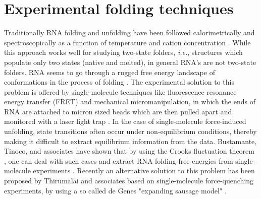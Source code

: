 \section{Experimental folding techniques}
Traditionally   RNA   folding  and   unfolding   have  been   followed
calorimetrically  and spectroscopically as  a function  of temperature
and cation concentration  \cite{bloomfield2000, boots2008}. While this
approach  works well  for studying  two-state  folders, \textit{i.e.},
structures  which populate  only two  states (native  and  melted), in
general RNA's  are not  two-state folders. RNA  seems to go  through a
rugged  free  energy landscape  of  conformations  in  the process  of
folding \cite{zhuang2003}.  The  experimental solution to this problem
is offered  by single-molecule techniques  like fluorescence resonance
energy transfer (FRET) and  mechanical micromanipulation, in which the
ends of RNA  are attached to micron sized beads  which are then pulled
apart  and  monitored  with  a laser  light  trap  \cite{liphardt2001,
  onoa2004,  tinoco2004, hyeon2005}.  In  the case  of single-molecule
force-induced   unfolding,  state   transitions   often  occur   under
non-equilibrium  conditions, thereby  making it  difficult  to extract
equilibrium  information from the  data. Bustamante, Tinoco,
and associates have shown that by using the Crooks fluctuation theorem
\cite{crooks1999},  one  can deal  with  such  cases  and extract  RNA
folding    free     energies    from    single-molecule    experiments
\cite{collin2005}. Recently an alternative solution to this problem has
been proposed by Thirumalai and associates based on single-molecule
force-quenching experiments, by using a so called  de Genes "expanding
sausage model" \cite{hyeon2009}.


